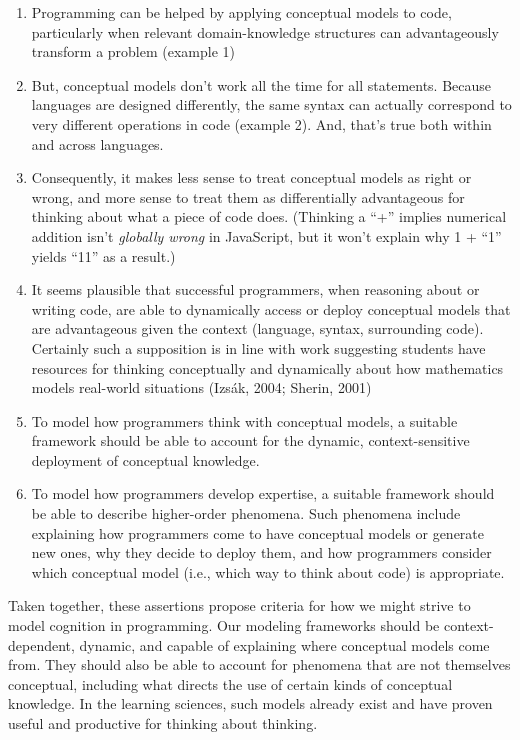 \begin{enumerate}
\def\labelenumi{\arabic{enumi}.}
\tightlist
\item
  Programming can be helped by applying conceptual models to code,
  particularly when relevant domain-knowledge structures can
  advantageously transform a problem (example 1)
\item
  But, conceptual models don't work all the time for all statements.
  Because languages are designed differently, the same syntax can
  actually correspond to very different operations in code (example 2).
  And, that's true both within and across languages.
\item
  Consequently, it makes less sense to treat conceptual models as right
  or wrong, and more sense to treat them as differentially advantageous
  for thinking about what a piece of code does. (Thinking a ``+''
  implies numerical addition isn't \emph{globally wrong} in JavaScript,
  but it won't explain why 1 + ``1'' yields ``11'' as a result.)
\item
  It seems plausible that successful programmers, when reasoning about
  or writing code, are able to dynamically access or deploy conceptual
  models that are advantageous given the context (language, syntax,
  surrounding code). Certainly such a supposition is in line with work
  suggesting students have resources for thinking conceptually and
  dynamically about how mathematics models real-world situations (Izsák,
  2004; Sherin, 2001)
\item
  To model how programmers think with conceptual models, a suitable
  framework should be able to account for the dynamic, context-sensitive
  deployment of conceptual knowledge.
\item
  To model how programmers develop expertise, a suitable framework
  should be able to describe higher-order phenomena. Such phenomena
  include explaining how programmers come to have conceptual models or
  generate new ones, why they decide to deploy them, and how programmers
  consider which conceptual model (i.e., which way to think about code)
  is appropriate.
\end{enumerate}

Taken together, these assertions propose criteria for how we might
strive to model cognition in programming. Our modeling frameworks should
be context-dependent, dynamic, and capable of explaining where
conceptual models come from. They should also be able to account for
phenomena that are not themselves conceptual, including what directs the
use of certain kinds of conceptual knowledge. In the learning sciences,
such models already exist and have proven useful and productive for
thinking about thinking.

